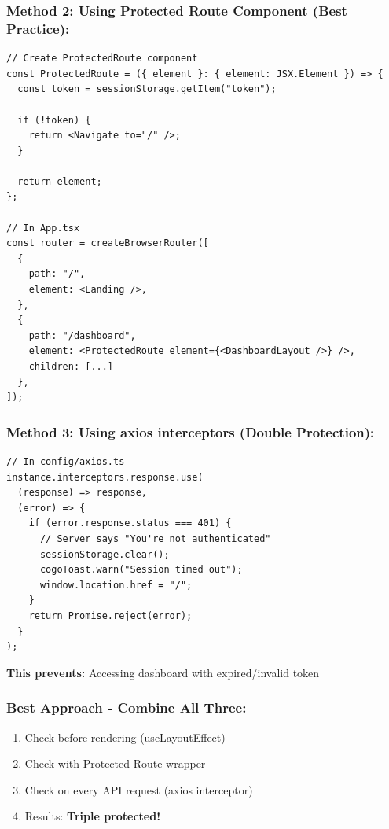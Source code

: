 \documentclass[12pt]{article}
\begin{document}
\subsubsection*{Method 2: Using Protected Route Component (Best Practice):}

\begin{lstlisting}
// Create ProtectedRoute component
const ProtectedRoute = ({ element }: { element: JSX.Element }) => {
  const token = sessionStorage.getItem("token");
  
  if (!token) {
    return <Navigate to="/" />;
  }
  
  return element;
};

// In App.tsx
const router = createBrowserRouter([
  {
    path: "/",
    element: <Landing />,
  },
  {
    path: "/dashboard",
    element: <ProtectedRoute element={<DashboardLayout />} />,
    children: [...]
  },
]);
\end{lstlisting}

\subsubsection*{Method 3: Using axios interceptors (Double Protection):}

\begin{lstlisting}
// In config/axios.ts
instance.interceptors.response.use(
  (response) => response,
  (error) => {
    if (error.response.status === 401) {
      // Server says "You're not authenticated"
      sessionStorage.clear();
      cogoToast.warn("Session timed out");
      window.location.href = "/";
    }
    return Promise.reject(error);
  }
);
\end{lstlisting}

\textbf{This prevents:} Accessing dashboard with expired/invalid token

\subsubsection*{Best Approach - Combine All Three:}

\begin{enumerate}
    \item Check before rendering (useLayoutEffect)
    \item Check with Protected Route wrapper
    \item Check on every API request (axios interceptor)
    \item Results: \textbf{Triple protected!}
\end{enumerate}
\end{document}
